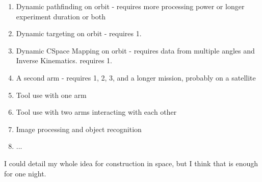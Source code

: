 \begin{enumerate}
\item{Dynamic pathfinding on orbit - requires more processing power or longer experiment duration or both}
\item{Dynamic targeting on orbit - requires 1.}
\item{Dynamic CSpace Mapping on orbit - requires data from multiple angles and Inverse Kinematics. requires 1.}
\item{A second arm - requires 1, 2, 3, and a longer mission, probably on a satellite}
\item{Tool use with one arm}
\item{Tool use with two arms interacting with each other}
\item{Image processing and object recognition}
\item{...}
\end{enumerate}
I could detail my whole idea for construction in space, but I think that is enough for one night.

